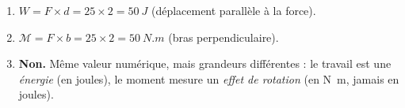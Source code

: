 \documentclass[11pt,a4paper]{article}
\begin{document}
\begin{corrige}
\begin{enumerate}[label=\alph*)]
  \item $W = F\times d = 25\times 2 = \qty{50}{J}$ (déplacement parallèle à la force).
  \item $\mathcal{M} = F\times b = 25\times 2 = \qty{50}{N.m}$ (bras perpendiculaire).
  \item \textbf{Non.} Même valeur numérique, mais grandeurs différentes : le travail est une
        \emph{énergie} (en joules), le moment mesure un \emph{effet de rotation} (en \si{\newton\metre},
        jamais en joules).
\end{enumerate}
\end{corrige}
\end{document}
